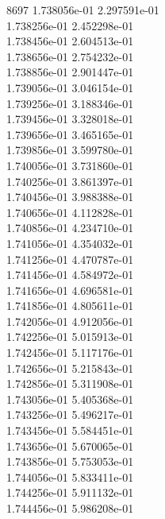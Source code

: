 8697	1.738056e-01	2.297591e-01	\\ 	1.738256e-01	2.452298e-01	\\ 	1.738456e-01	2.604513e-01	\\ 	1.738656e-01	2.754232e-01	\\ 	1.738856e-01	2.901447e-01	\\ 	1.739056e-01	3.046154e-01	\\ 	1.739256e-01	3.188346e-01	\\ 	1.739456e-01	3.328018e-01	\\ 	1.739656e-01	3.465165e-01	\\ 	1.739856e-01	3.599780e-01	\\ 	1.740056e-01	3.731860e-01	\\ 	1.740256e-01	3.861397e-01	\\ 	1.740456e-01	3.988388e-01	\\ 	1.740656e-01	4.112828e-01	\\ 	1.740856e-01	4.234710e-01	\\ 	1.741056e-01	4.354032e-01	\\ 	1.741256e-01	4.470787e-01	\\ 	1.741456e-01	4.584972e-01	\\ 	1.741656e-01	4.696581e-01	\\ 	1.741856e-01	4.805611e-01	\\ 	1.742056e-01	4.912056e-01	\\ 	1.742256e-01	5.015913e-01	\\ 	1.742456e-01	5.117176e-01	\\ 	1.742656e-01	5.215843e-01	\\ 	1.742856e-01	5.311908e-01	\\ 	1.743056e-01	5.405368e-01	\\ 	1.743256e-01	5.496217e-01	\\ 	1.743456e-01	5.584451e-01	\\ 	1.743656e-01	5.670065e-01	\\ 	1.743856e-01	5.753053e-01	\\ 	1.744056e-01	5.833411e-01	\\ 	1.744256e-01	5.911132e-01	\\ 	1.744456e-01	5.986208e-01	\\ \hline
